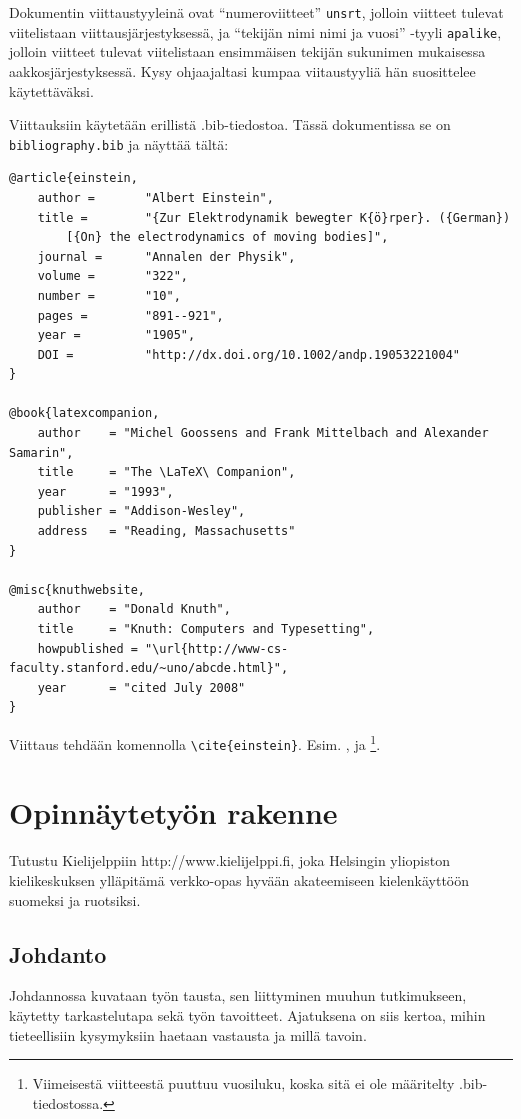 \documentclass[finnish,twoside,openright,utf]{HYgradu}
\begin{document}
Dokumentin viittaustyyleinä ovat ``numeroviitteet'' \texttt{unsrt}, jolloin viitteet tulevat viitelistaan viittausjärjestyksessä,  ja  ``tekijän nimi nimi ja vuosi'' -tyyli \texttt{apalike}, jolloin viitteet tulevat viitelistaan ensimmäisen tekijän sukunimen mukaisessa aakkosjärjestyksessä. Kysy ohjaajaltasi kumpaa viitaustyyliä hän suosittelee käytettäväksi.

Viittauksiin käytetään erillistä .bib-tiedostoa. Tässä dokumentissa se on \texttt{bibliography.bib} ja näyttää tältä:
\begin{verbatim}
@article{einstein,
    author =       "Albert Einstein",
    title =        "{Zur Elektrodynamik bewegter K{ö}rper}. ({German})
        [{On} the electrodynamics of moving bodies]",
    journal =      "Annalen der Physik",
    volume =       "322",
    number =       "10",
    pages =        "891--921",
    year =         "1905",
    DOI =          "http://dx.doi.org/10.1002/andp.19053221004"
}
 
@book{latexcompanion,
    author    = "Michel Goossens and Frank Mittelbach and Alexander Samarin",
    title     = "The \LaTeX\ Companion",
    year      = "1993",
    publisher = "Addison-Wesley",
    address   = "Reading, Massachusetts"
}
 
@misc{knuthwebsite,
    author    = "Donald Knuth",
    title     = "Knuth: Computers and Typesetting",
    howpublished = "\url{http://www-cs-faculty.stanford.edu/~uno/abcde.html}",
    year      = "cited July 2008"    
}
\end{verbatim}

Viittaus tehdään komennolla \texttt{\textbackslash cite\{einstein\}}. Esim. 
\cite{einstein}, \cite{latexcompanion} ja \cite{knuthwebsite}\footnote{Viimeisestä viitteestä puuttuu vuosiluku, koska sitä ei ole määritelty .bib-tiedostossa.}.

\chapter{ Opinnäytetyön rakenne}

Tutustu Kielijelppiin http://www.kielijelppi.fi, joka Helsingin  yliopiston kielikeskuksen ylläpitämä verkko-opas hyvään akateemiseen kielenkäyttöön suomeksi ja ruotsiksi.  

\section{Johdanto}
Johdannossa kuvataan työn tausta, sen liittyminen muuhun tutkimukseen, käytetty tarkastelutapa sekä työn tavoitteet. Ajatuksena on siis kertoa, mihin tieteellisiin kysymyksiin haetaan vastausta ja millä tavoin.
\end{document}
